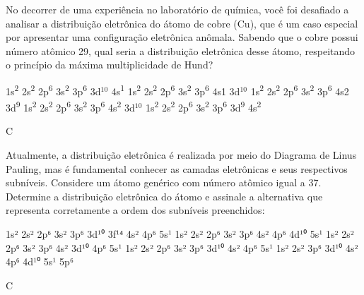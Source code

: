 \documentclass[9 pt]{scrartcl}
\def\PQ{0.84} %
\begin{document}
\begin{exercise}[points=\PQ]
No decorrer de uma experiência no laboratório de química, você foi desafiado a analisar a distribuição eletrônica do átomo de cobre (Cu), que é um caso especial por apresentar uma configuração eletrônica anômala. Sabendo que o cobre possui número atômico 29, qual seria a distribuição eletrônica desse átomo, respeitando o princípio da máxima multiplicidade de Hund?
\begin{choice}
\choice 1s\textsuperscript{2} 2s\textsuperscript{2} 2p\textsuperscript{6} 3s\textsuperscript{2} 3p\textsuperscript{6} 3d$^{10}$ 4s\textsuperscript{1}
\choice 1s\textsuperscript{2} 2s\textsuperscript{2} 2p\textsuperscript{6} 3s\textsuperscript{2} 3p\textsuperscript{6} 4s1 3d$^{10}$
\choice 1s\textsuperscript{2} 2s\textsuperscript{2} 2p\textsuperscript{6} 3s\textsuperscript{2} 3p\textsuperscript{6} 4s2 3d\textsuperscript{9}
\choice 1s\textsuperscript{2} 2s\textsuperscript{2} 2p\textsuperscript{6} 3s\textsuperscript{2} 3p\textsuperscript{6} 4s\textsuperscript{2} 3d$^{10}$
\choice 1s\textsuperscript{2} 2s\textsuperscript{2} 2p\textsuperscript{6} 3s\textsuperscript{2} 3p\textsuperscript{6} 3d\textsuperscript{9} 4s\textsuperscript{2}
\end{choice}
\end{exercise}
\begin{solution}
C
\end{solution}




\begin{exercise}[points=\PQ]
Atualmente, a distribuição eletrônica é realizada por meio do Diagrama de Linus Pauling, mas é fundamental conhecer as camadas eletrônicas e seus respectivos subníveis. Considere um átomo genérico com número atômico igual a 37. Determine a distribuição eletrônica do átomo e assinale a alternativa que representa corretamente a ordem dos subníveis preenchidos:
\begin{choice}
\choice 1s² 2s² 2p⁶ 3s² 3p⁶ 3d¹⁰ 3f¹⁴ 4s² 4p⁶ 5s¹
\choice 1s² 2s² 2p⁶ 3s² 3p⁶ 4s² 4p⁶ 4d¹⁰ 5s¹
\choice  1s² 2s² 2p⁶ 3s² 3p⁶ 4s² 3d¹⁰ 4p⁶ 5s¹
\choice 1s² 2s² 2p⁶ 3s² 3p⁶ 3d¹⁰ 4s² 4p⁶ 5s¹
\choice 1s² 2s² 3p⁶ 3d¹⁰ 4s² 4p⁶ 4d¹⁰ 5s¹ 5p⁶
\end{choice}
\end{exercise}
\begin{solution}
C
\end{solution}
\end{document}
